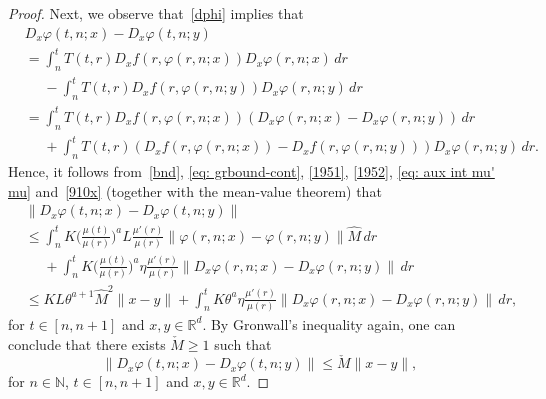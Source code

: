 \documentclass[10pt,a4paper]{amsart}
\def\N{\mathbb{N}}
\def\R{\mathbb{R}}
\renewcommand{\phi}{\varphi}
\begin{document}
\begin{proof}
Next, we observe that~\eqref{dphi} implies that 
\[
\begin{split}
&D_x\phi(t, n;x)-D_x\phi(t, n; y)
\\
&=\int_n^t T(t,r)D_xf(r, \phi(r, n;x))D_x\phi(r, n;x)\, dr \\
&\phantom{=}-\int_n^t T(t,r)D_xf(r, \phi(r, n;y))D_x\phi(r, n;y)\, dr \\
&=\int_n^t T(t,r)D_xf(r, \phi(r, n;x))(D_x\phi(r, n;x)-D_x\phi(r, n;y))\, dr \\
&\phantom{=}+\int_n^t T(t,r)(D_xf(r, \phi(r, n;x))-D_xf(r, \phi(r, n;y)))D_x\phi(r, n;y)\, dr.
\end{split}
\]
Hence, it follows from~\eqref{bnd}, \eqref{eq: grbound-cont}, \eqref{1951}, \eqref{1952}, \eqref{eq: aux int mu' mu} and~\eqref{910x} (together with the
mean-value theorem) that
\[
\begin{split}
&\lVert D_x\phi(t, n;x)-D_x\phi(t, n; y)  \rVert
\\
&\leq \int_n^t K \bigg (\frac{\mu(t)}{\mu(r)}\bigg )^a L\frac{\mu'(r)}{\mu(r)} \lVert \phi(r, n;x)-\phi(r, n;y)\rVert \hat M \, dr\\
&\phantom{=}+\int_n^t K \bigg (\frac{\mu(t)}{\mu(r)}\bigg )^a \eta \frac{\mu'(r)}{\mu(r)} \lVert D_x\phi(r, n;x)-D_x\phi(r, n;y)\rVert \, dr\\
&\le KL \theta^{a+1}\hat M^2\|x-y\|+ \int_n^t K\theta^a \eta \frac{\mu'(r)}{\mu(r)} \lVert D_x\phi(r, n;x)-D_x\phi(r, n;y)\rVert \, dr,
\end{split}
\]
for $t\in [n, n+1]$ and $x, y\in \R^d$.   By Gronwall's inequality again, one can conclude that there exists $\check M\geq 1$ such that
\begin{equation}\label{Df-Df}
\lVert D_x\phi(t, n;x)-D_x\phi(t, n; y)  \rVert  \le  \check M\lVert x-y\rVert,
\end{equation}
for $n\in \N$, $t\in [n, n+1]$ and $x, y\in \R^d$.


\end{proof}
\end{document}
